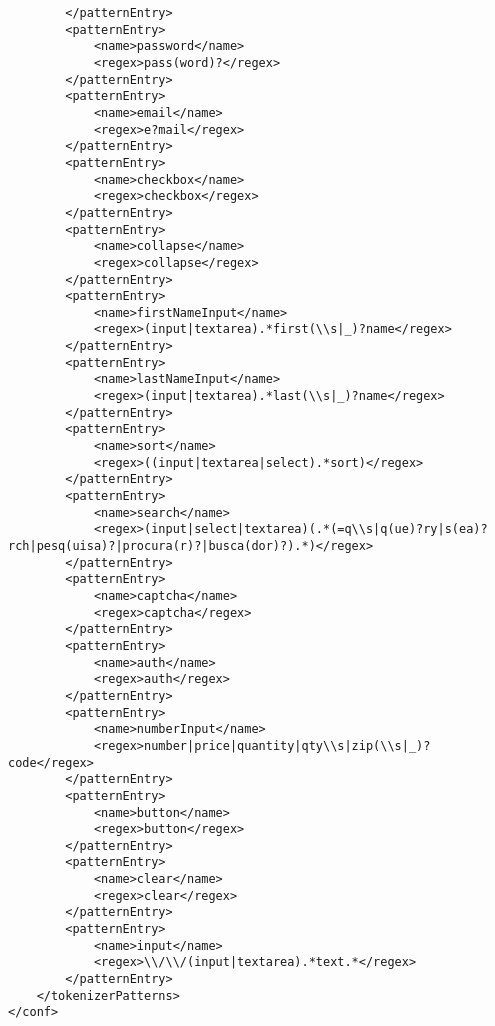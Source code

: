 \begin{lstlisting}
		</patternEntry>
		<patternEntry>
			<name>password</name>
			<regex>pass(word)?</regex>
		</patternEntry>
		<patternEntry>
			<name>email</name>
			<regex>e?mail</regex>
		</patternEntry>
		<patternEntry>
			<name>checkbox</name>
			<regex>checkbox</regex>
		</patternEntry>
		<patternEntry>
			<name>collapse</name>
			<regex>collapse</regex>
		</patternEntry>
		<patternEntry>
			<name>firstNameInput</name>
			<regex>(input|textarea).*first(\\s|_)?name</regex>
		</patternEntry>
		<patternEntry>
			<name>lastNameInput</name>
			<regex>(input|textarea).*last(\\s|_)?name</regex>
		</patternEntry>
		<patternEntry>
			<name>sort</name>
			<regex>((input|textarea|select).*sort)</regex>
		</patternEntry>
		<patternEntry>
			<name>search</name>
			<regex>(input|select|textarea)(.*(=q\\s|q(ue)?ry|s(ea)?rch|pesq(uisa)?|procura(r)?|busca(dor)?).*)</regex>
		</patternEntry>
		<patternEntry>
			<name>captcha</name>
			<regex>captcha</regex>
		</patternEntry>
		<patternEntry>
			<name>auth</name>
			<regex>auth</regex>
		</patternEntry>
		<patternEntry>
			<name>numberInput</name>
			<regex>number|price|quantity|qty\\s|zip(\\s|_)?code</regex>
		</patternEntry>
		<patternEntry>
            <name>button</name>
            <regex>button</regex>
        </patternEntry>
		<patternEntry>
			<name>clear</name>
			<regex>clear</regex>
		</patternEntry>
		<patternEntry>
            <name>input</name>
            <regex>\\/\\/(input|textarea).*text.*</regex>
        </patternEntry>
	</tokenizerPatterns>
</conf>
\end{lstlisting}

